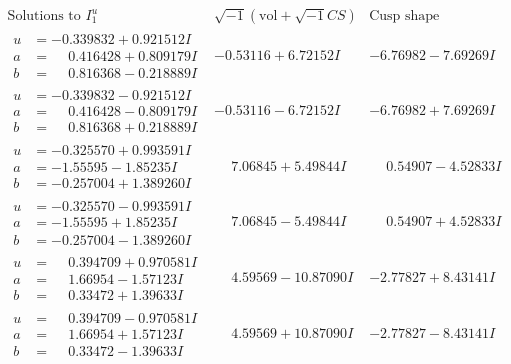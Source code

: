 \documentclass[1p]{elsarticle_modified}
\theoremstyle{definition}
\newcommand{\I}{\sqrt{-1}}
\begin{document}
$$\begin{array}{c|c|c}  
\text{Solutions to }I^u_{1}& \I (\text{vol} + \sqrt{-1}CS) & \text{Cusp shape}\\
 \hline 
\begin{aligned}
u &= -0.339832 + 0.921512 I \\
a &= \phantom{-}0.416428 + 0.809179 I \\
b &= \phantom{-}0.816368 - 0.218889 I\end{aligned}
 & -0.53116 + 6.72152 I & -6.76982 - 7.69269 I \\ \hline\begin{aligned}
u &= -0.339832 - 0.921512 I \\
a &= \phantom{-}0.416428 - 0.809179 I \\
b &= \phantom{-}0.816368 + 0.218889 I\end{aligned}
 & -0.53116 - 6.72152 I & -6.76982 + 7.69269 I \\ \hline\begin{aligned}
u &= -0.325570 + 0.993591 I \\
a &= -1.55595 - 1.85235 I \\
b &= -0.257004 + 1.389260 I\end{aligned}
 & \phantom{-}7.06845 + 5.49844 I & \phantom{-}0.54907 - 4.52833 I \\ \hline\begin{aligned}
u &= -0.325570 - 0.993591 I \\
a &= -1.55595 + 1.85235 I \\
b &= -0.257004 - 1.389260 I\end{aligned}
 & \phantom{-}7.06845 - 5.49844 I & \phantom{-}0.54907 + 4.52833 I \\ \hline\begin{aligned}
u &= \phantom{-}0.394709 + 0.970581 I \\
a &= \phantom{-}1.66954 - 1.57123 I \\
b &= \phantom{-}0.33472 + 1.39633 I\end{aligned}
 & \phantom{-}4.59569 - 10.87090 I & -2.77827 + 8.43141 I \\ \hline\begin{aligned}
u &= \phantom{-}0.394709 - 0.970581 I \\
a &= \phantom{-}1.66954 + 1.57123 I \\
b &= \phantom{-}0.33472 - 1.39633 I\end{aligned}
 & \phantom{-}4.59569 + 10.87090 I & -2.77827 - 8.43141 I \\ \hline\begin{aligned}

\end{aligned}
\end{array}$$
\end{document}
